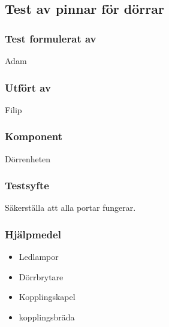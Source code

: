 \subsection{Test av pinnar för dörrar}
\label{test:portTest}

\setlength{\columnsep}{1cm}




\begin{multicols}{2}
\subsubsection*{Test formulerat av}
Adam

\subsubsection*{Utfört av}
Filip


\end{multicols}
\subsubsection*{Komponent}
Dörrenheten


\subsubsection*{Testsyfte}
Säkerställa att alla portar fungerar.


\subsubsection*{Hjälpmedel}
\begin{itemize}
	\item Ledlampor
	\item Dörrbrytare
	\item Kopplingskapel
	\item kopplingsbräda
\end{itemize}



